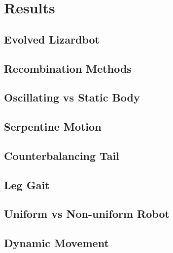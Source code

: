 \documentclass{article}
\begin{document}
\section{Results}

\subsection{Evolved Lizardbot}

\subsection{Recombination Methods}

\subsection{Oscillating vs Static Body}

\subsection{Serpentine Motion}

\subsection{Counterbalancing Tail}

\subsection{Leg Gait}

\subsection{Uniform vs Non-uniform Robot}

\subsection{Dynamic Movement}
\end{document}
